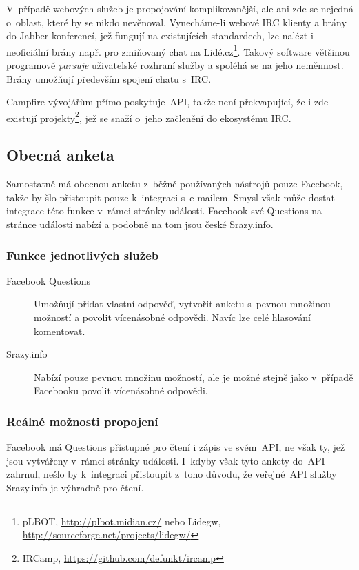 \documentclass[12pt,oneside,final]{fithesis2}
\begin{document}
V~případě webových služeb je propojování komplikovanější, ale ani zde se nejedná o~oblast, které by se nikdo nevěnoval. Vynecháme-li webové IRC klienty a brány do Jabber konferencí, jež fungují na existujících standardech, lze nalézt i neoficiální brány např. pro zmiňovaný chat na Lidé.cz\footnote{pLBOT, \url{http://plbot.midian.cz/} nebo Lidegw, \url{http://sourceforge.net/projects/lidegw/}}. Takový software většinou programově \emph{parsuje} uživatelské rozhraní služby a spoléhá se na jeho neměnnost. Brány umožňují především spojení chatu s~IRC.

Campfire vývojářům přímo poskytuje~API, takže není překvapující, že i zde existují projekty\footnote{IRCamp, \url{https://github.com/defunkt/ircamp}}, jež se snaží o~jeho začlenění do ekosystému IRC.

\subsection{Obecná anketa}\label{genericPoll}
Samostatně má obecnou anketu z~běžně používaných nástrojů pouze Facebook, takže by šlo přistoupit pouze k~integraci s~e-mailem. Smysl však může dostat integrace této funkce v~rámci stránky události. Facebook své Questions na stránce události nabízí a podobně na tom jsou české Srazy.info.

\subsubsection*{Funkce jednotlivých služeb}
\begin{description}
    \item[Facebook Questions]
        Umožňují přidat vlastní odpověď, vytvořit anketu s~pevnou množinou možností a povolit vícenásobné odpovědi. Navíc lze celé hlasování komentovat.

    \item[Srazy.info]
        Nabízí pouze pevnou množinu možností, ale je možné stejně jako v~případě Facebooku povolit vícenásobné odpovědi.
\end{description}

\subsubsection*{Reálné možnosti propojení}
Facebook má Questions přístupné pro čtení i zápis ve svém~API, ne však ty, jež jsou vytvářeny v~rámci stránky události. I~kdyby však tyto ankety do~API zahrnul, nešlo by k~integraci přistoupit z~toho důvodu, že veřejné~API služby Srazy.info je výhradně pro čtení.
\end{document}
